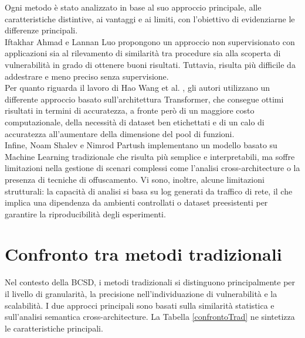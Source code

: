 \documentclass[12pt,a4paper,openright,twoside]{report}
\begin{document}
Ogni metodo è stato analizzato in base al suo approccio principale, alle caratteristiche distintive, ai vantaggi e ai limiti, con l’obiettivo di evidenziarne le differenze principali.\\
Iftakhar Ahmad e Lannan Luo \cite{UnsuperBinTrans} propongono un approccio non supervisionato con applicazioni sia al rilevamento di similarità tra procedure sia alla scoperta di vulnerabilità in grado di ottenere buoni risultati. Tuttavia, risulta più difficile da addestrare e meno preciso senza supervisione.\\
Per quanto riguarda il lavoro di Hao Wang et al. \cite{jTrans}, gli autori utilizzano un differente approccio basato sull'architettura Transformer, che consegue ottimi risultati in termini di accuratezza, a fronte però di un maggiore costo computazionale, della necessità di dataset ben etichettati e di un calo di accuratezza all'aumentare della dimensione del pool di funzioni. \\
Infine, Noam Shalev e Nimrod Partush \cite{Zeek} implementano un modello basato su Machine Learning tradizionale che risulta più semplice e interpretabili, ma soffre limitazioni nella gestione di scenari complessi come l’analisi cross-architecture o la presenza di tecniche di offuscamento. Vi sono, inoltre, alcune limitazioni strutturali: la capacità di analisi si basa su log generati da traffico di rete, il che implica una dipendenza da ambienti controllati o dataset preesistenti per garantire la riproducibilità degli esperimenti. 

\section{Confronto tra metodi tradizionali}

Nel contesto della BCSD, i metodi tradizionali si distinguono principalmente per il livello di granularità, la precisione nell’individuazione di vulnerabilità e la scalabilità. I due approcci principali sono basati sulla similarità statistica e sull’analisi semantica cross-architecture. La Tabella \ref{confrontoTrad} ne sintetizza le caratteristiche principali.
\end{document}
